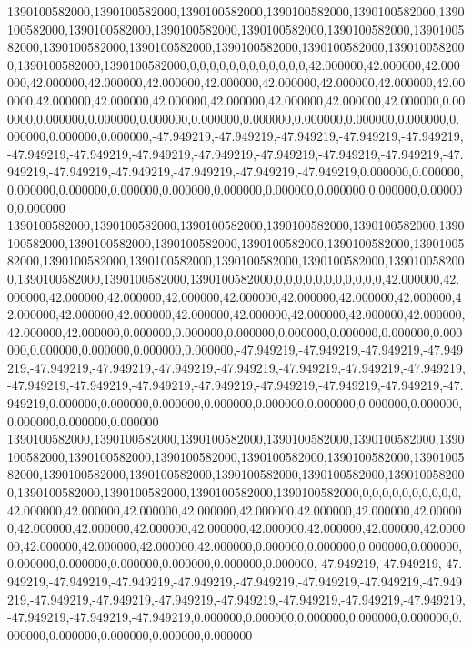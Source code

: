 1390100582000,1390100582000,1390100582000,1390100582000,1390100582000,1390100582000,1390100582000,1390100582000,1390100582000,1390100582000,1390100582000,1390100582000,1390100582000,1390100582000,1390100582000,1390100582000,1390100582000,1390100582000,0,0,0,0,0,0,0,0,0,0,0,0,42.000000,42.000000,42.000000,42.000000,42.000000,42.000000,42.000000,42.000000,42.000000,42.000000,42.000000,42.000000,42.000000,42.000000,42.000000,42.000000,42.000000,42.000000,0.000000,0.000000,0.000000,0.000000,0.000000,0.000000,0.000000,0.000000,0.000000,0.000000,0.000000,0.000000,-47.949219,-47.949219,-47.949219,-47.949219,-47.949219,-47.949219,-47.949219,-47.949219,-47.949219,-47.949219,-47.949219,-47.949219,-47.949219,-47.949219,-47.949219,-47.949219,-47.949219,-47.949219,0.000000,0.000000,0.000000,0.000000,0.000000,0.000000,0.000000,0.000000,0.000000,0.000000,0.000000,0.000000
1390100582000,1390100582000,1390100582000,1390100582000,1390100582000,1390100582000,1390100582000,1390100582000,1390100582000,1390100582000,1390100582000,1390100582000,1390100582000,1390100582000,1390100582000,1390100582000,1390100582000,1390100582000,1390100582000,0,0,0,0,0,0,0,0,0,0,0,42.000000,42.000000,42.000000,42.000000,42.000000,42.000000,42.000000,42.000000,42.000000,42.000000,42.000000,42.000000,42.000000,42.000000,42.000000,42.000000,42.000000,42.000000,42.000000,0.000000,0.000000,0.000000,0.000000,0.000000,0.000000,0.000000,0.000000,0.000000,0.000000,0.000000,-47.949219,-47.949219,-47.949219,-47.949219,-47.949219,-47.949219,-47.949219,-47.949219,-47.949219,-47.949219,-47.949219,-47.949219,-47.949219,-47.949219,-47.949219,-47.949219,-47.949219,-47.949219,-47.949219,0.000000,0.000000,0.000000,0.000000,0.000000,0.000000,0.000000,0.000000,0.000000,0.000000,0.000000
1390100582000,1390100582000,1390100582000,1390100582000,1390100582000,1390100582000,1390100582000,1390100582000,1390100582000,1390100582000,1390100582000,1390100582000,1390100582000,1390100582000,1390100582000,1390100582000,1390100582000,1390100582000,1390100582000,1390100582000,0,0,0,0,0,0,0,0,0,0,42.000000,42.000000,42.000000,42.000000,42.000000,42.000000,42.000000,42.000000,42.000000,42.000000,42.000000,42.000000,42.000000,42.000000,42.000000,42.000000,42.000000,42.000000,42.000000,42.000000,0.000000,0.000000,0.000000,0.000000,0.000000,0.000000,0.000000,0.000000,0.000000,0.000000,-47.949219,-47.949219,-47.949219,-47.949219,-47.949219,-47.949219,-47.949219,-47.949219,-47.949219,-47.949219,-47.949219,-47.949219,-47.949219,-47.949219,-47.949219,-47.949219,-47.949219,-47.949219,-47.949219,-47.949219,0.000000,0.000000,0.000000,0.000000,0.000000,0.000000,0.000000,0.000000,0.000000,0.000000
